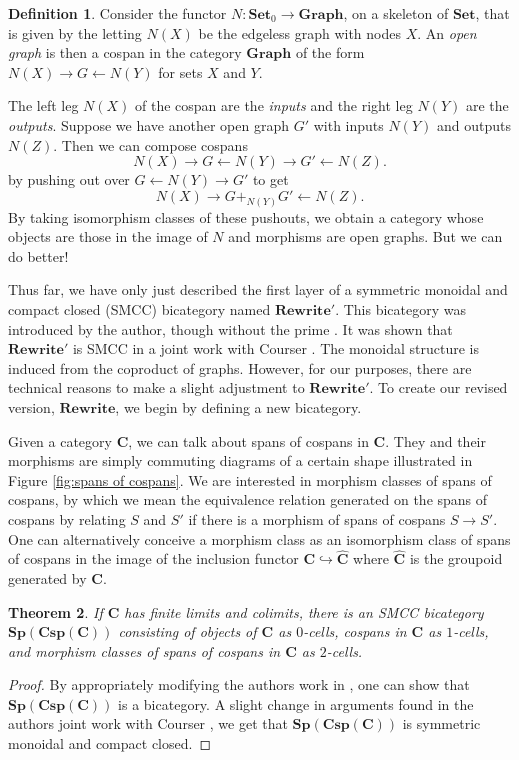 \documentclass[11pt]{amsart}
\newcommand{\cat}[1]{\mathbf{#1}}
\newcommand{\from}{\colon}
\newcommand{\bispcs}[1]{\mathbf{Sp}(\mathbf{Csp}(\mathbf{#1}))}
\newtheorem{thm}{Theorem}[section]
\theoremstyle{remark}
\theoremstyle{definition}
\newtheorem{defn}[thm]{Definition}
\begin{document}
\begin{defn}
\label{def:Open Graph}
	Consider the functor $N \from \cat{Set}_0 \to \cat{Graph}$, on a skeleton of $\cat{Set}$, that is given by the letting $N(X)$ be the edgeless graph with nodes $X$.  An \emph{open graph} is then a cospan in the category $\cat{Graph}$ of the form $N(X) \to G \gets N(Y)$ for sets $X$ and $Y$.
\end{defn}

The left leg $N(X)$ of the cospan are the \emph{inputs} and the right leg $N(Y)$ are the \emph{outputs}.  Suppose we have another open graph $G'$ with inputs $N(Y)$ and outputs $N(Z)$.  Then we can compose cospans 
\[
N(X) \to G \gets N(Y) \to G' \gets N(Z). 
\] 
by pushing out over $G \gets N(Y) \to G'$ to get 
\[
N(X) \to G +_{N(Y)} G' \gets N(Z).
\] 
By taking isomorphism classes of these pushouts, we obtain a category whose objects are those in the image of $N$ and morphisms are open graphs. But we can do better! 

Thus far, we have only just described the first layer of a symmetric monoidal and compact closed (SMCC) bicategory named $\cat{Rewrite'}$.  This bicategory was introduced by the author, though without the prime \cite{Cicala_SpansCospans}. It was shown that $\cat{Rewrite'}$ is SMCC in a joint work with Courser \cite{CicalaCourser_BicatSpansCospan}. The monoidal structure is induced from the coproduct of graphs.  However, for our purposes, there are technical reasons to make a slight adjustment to $\cat{Rewrite'}$.  To create our revised version, $\cat{Rewrite}$, we begin by defining a new bicategory.

Given a category $\cat{C}$, we can talk about spans of cospans in $\cat{C}$.  They and their morphisms are simply commuting diagrams of a certain shape illustrated in Figure \ref{fig:spans of cospans}.  We are interested in morphism classes of spans of cospans, by which we mean the equivalence relation generated on the spans of cospans by relating $S$ and $S'$ if there is a morphism of spans of cospans $S \to S'$.  One can alternatively conceive a morphism class as an isomorphism class of spans of cospans in the image of the inclusion functor $\cat{C} \hookrightarrow \widehat{\cat{C}}$ where $\widehat{\cat{C}}$ is the groupoid generated by $\cat{C}$.   

\begin{thm}
\label{thm:SpCspC is SMCC bicategory}
	If $\cat{C}$ has finite limits and colimits, there is an SMCC bicategory $\bispcs{C}$ consisting of objects of $\cat{C}$ as $0$-cells, cospans in $\cat{C}$ as $1$-cells, and morphism classes of spans of cospans in $\cat{C}$ as $2$-cells. 
\end{thm}
\begin{proof}
	By appropriately modifying the authors work in \cite{Cicala_SpansCospans}, one can show that $\bispcs{C}$ is a bicategory.  A slight change in arguments found in the authors joint work with Courser \cite{CicalaCourser_BicatSpansCospan}, we get that $\bispcs{C}$ is symmetric monoidal and compact closed.
\end{proof}
\end{document}
